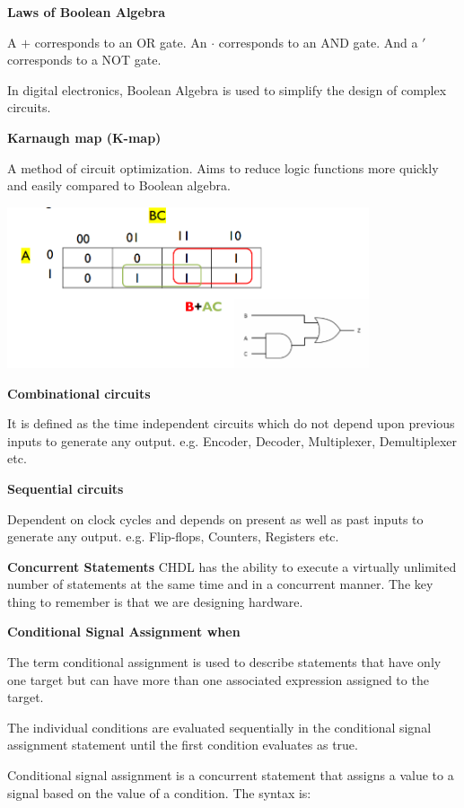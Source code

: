 \textbf{Laws of Boolean Algebra}

A $+$ corresponds to an OR gate. An $\cdot$ corresponds to an AND gate.
And a $'$ corresponds to a NOT gate.

In digital electronics, Boolean Algebra is used to simplify the
design of complex circuits.


\textbf{Karnaugh map (K-map)}

A method of circuit optimization. Aims to reduce logic functions
more quickly and easily compared to Boolean algebra.

\begin{center}
	\includegraphics[width=0.8\textwidth]{images/kmap.png}
\end{center}


\textbf{Combinational circuits}

It is defined as the time independent circuits which do not depend upon previous
inputs to generate any output.
e.g. Encoder, Decoder, Multiplexer, Demultiplexer etc.

\textbf{Sequential circuits}

Dependent on clock cycles and depends on present as well as past inputs to generate any output.
e.g. Flip-flops, Counters, Registers etc.


\textbf{Concurrent Statements}
CHDL has the ability to execute a virtually unlimited number of statements at the same time and in a concurrent manner. The key thing to remember is that we are
designing hardware.

\textbf{Conditional Signal Assignment when}

The term conditional assignment is used to describe statements that
have only one target but can have more than one associated expression
assigned to the target.

The individual conditions are evaluated sequentially
in the conditional signal assignment statement until the first
condition evaluates as true.

Conditional signal assignment is a concurrent statement that assigns a
value to a signal based on the value of a condition. The syntax is:

